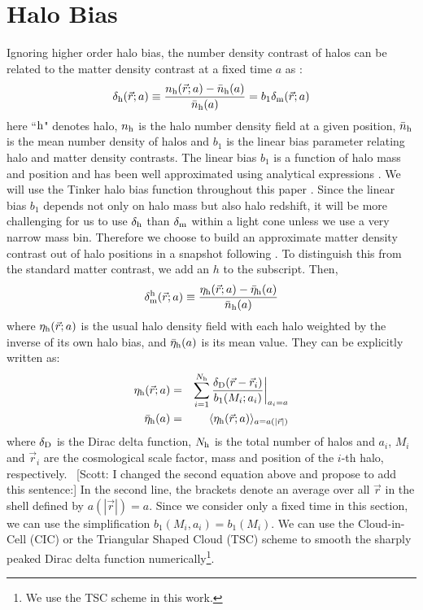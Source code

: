 \documentclass[prd,amsmath,amssymb,floatfix,superscriptaddress,nofootinbib,twocolumn]{revtex4-1}
\def\be{\begin{equation}}
\def\ee{\end{equation}}
\def\bea{\begin{eqnarray}}
\def\eea{\end{eqnarray}}
\newcommand{\vrr}{\vec{r}}
\newcommand{\eql}[1]{\label{eq:#1}}
\newcommand{\scott}[1]{{\color{darkgreen} \, [Scott: #1]}}
\newcommand\dmh{\delta_{\rm m}^{\rm h}}
\begin{document}
\section{Halo Bias} \label{sec2}
Ignoring higher order halo bias, the number density contrast of halos can be related to the matter density contrast at a fixed time $a$ as \cite{Desjacques:2018rev}:
\be 
\delta_{\rm h}(\vrr;a) \equiv \frac{n_{\rm h}(\vrr;a)-\bar{n}_{\rm h}(a)}{\bar{n}_{\rm h}(a)}=b_{1}\delta_{\rm m}(\vrr;a) \eql{hdc}
\ee 
here ``$\rm h$" denotes halo, $n_{\rm h}$ is the halo number density field at a given position, $\bar{n}_{\rm h}$ is the mean number density of halos and $b_{1}$ is the linear bias parameter relating halo and matter density contrasts. The linear bias $b_{1}$ is a function of halo mass and position and has been well approximated using analytical expressions \cite{Seljak:2004SW}\cite{Bhattacharya:2011MF}. We will use the Tinker halo bias function throughout this paper \cite{Tinker:2010Tinker}. Since the linear bias $b_1$ depends not only on halo mass but also halo redshift, it will be more challenging for us to use $\delta_{\rm h}$ than $\delta_{\rm m}$ within a light cone unless we use a very narrow mass bin. Therefore we choose to build an approximate matter density contrast out of halo positions in a snapshot following \cite{Pervical:2007GPS}. To distinguish this from the standard matter contrast, we add an $h$ to the subscript. Then,
\be 
\dmh(\vrr;a) \equiv \frac{\eta_{\rm h}(\vrr;a)-\bar{\eta}_{\rm h}(a)}{\bar{n}_{\rm h}(a)} \eql{hm}
\ee 
where $\eta_{\rm h}(\vrr;a)$ is the usual halo density field with each halo weighted by the inverse of its own halo bias, and $\bar{\eta}_{\rm h}(a)$ is its mean value. They can be explicitly written as:
\bea
\eta_{\rm h}(\vrr;a)&=&\sum_{i=1}^{N_{\rm h}}\frac{\delta_{\rm D}(\vrr-\vrr_{i})}{b_{1}(M_{i};a_{i})}\bigg|_{a_{i}=a} \eql{nob}\\
\bar{\eta}_{\rm h}(a)&=&\langle \eta_{\rm h}(\vrr;a)\rangle_{a=a(|\vrr|)}
\eea
where $\delta_{\rm D}$ is the Dirac delta function, $N_{\rm h}$ is the total number of halos and $a_{i}$, $M_{i}$ and $\vrr_{i}$ are the cosmological scale factor, mass and position of the $i$-th halo, respectively.\scott{I changed the second equation above and propose to add this sentence:} In the second line, the brackets denote an average over all $\vrr$ in the shell defined by $a(|\vrr|)=a$. Since we consider only a fixed time in this section, we can use the simplification $b_{1}(M_{i},a_{i})=b_{1}(M_i)$. We can use the Cloud-in-Cell (CIC) or the Triangular Shaped Cloud (TSC) scheme \cite{Sefusatti:2015CIC} to smooth the sharply peaked Dirac delta function numerically\footnote{We use the TSC scheme in this work.}.
\end{document}
